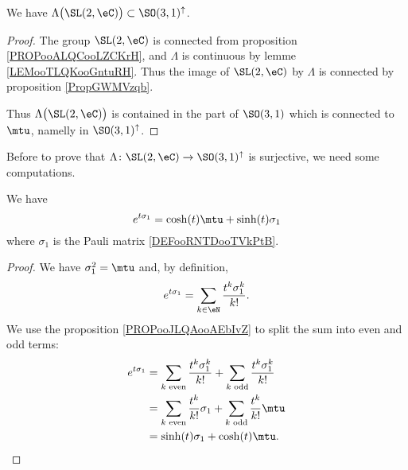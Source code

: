 \begin{lemma}
    We have \( \Lambda\big( \SL(2,\eC) \big)\subset \SO(3,1)^{\uparrow}\).
\end{lemma}

\begin{proof}
    The group \( \SL(2,\eC)\) is connected from proposition \ref{PROPooALQCooLZCKrH}, and \( \Lambda\) is continuous by lemme \ref{LEMooTLQKooGntuRH}. Thus the image of \( \SL(2,\eC)\) by \( \Lambda\) is connected by proposition \ref{PropGWMVzqb}.

    Thus \( \Lambda\big( \SL(2,\eC) \big)\) is contained in the part of \( \SO(3,1)\) which is connected to \( \mtu\), namelly in \( \SO(3,1)^{\uparrow}\).
\end{proof}

Before to prove that \( \Lambda\colon \SL(2,\eC)\to \SO(3,1)^{\uparrow}\) is surjective, we need some computations.

\begin{lemma}
    We have
    \begin{equation}
       e^{t\sigma_1}=\cosh(t )\mtu+\sinh( t )\sigma_1
    \end{equation}
    where \( \sigma_1\) is the Pauli matrix \eqref{DEFooRNTDooTVkPtB}.
\end{lemma}

\begin{proof}
    We have \( \sigma_1^2=\mtu\) and, by definition,
    \begin{equation}
        e^{t\sigma_1}=\sum_{k\in \eN}\frac{ t^k\sigma_1^k }{ k! }.
    \end{equation}
    We use the proposition \ref{PROPooJLQAooAEbIvZ} to split the sum into even and odd terms:
    \begin{subequations}
        \begin{align}
            e^{t\sigma_1}&=\sum_{k\text{ even}}\frac{ t^k\sigma_1^k }{ k! }+  \sum_{k\text{ odd}}\frac{ t^k\sigma_1^k }{ k! }\\
        &=\sum_{k\text{ even}}\frac{ t^k }{ k! }\sigma_1+  \sum_{k\text{ odd}}\frac{ t^k }{ k! }\mtu\\
        &=\sinh(t)\sigma_1+\cosh(t)\mtu.
        \end{align}
    \end{subequations}
\end{proof}


